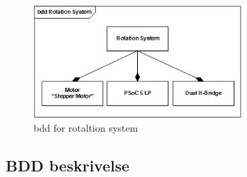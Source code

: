 \begin{figure}[H]
	\centering
	\includegraphics[width=0.7\textwidth, angle = 0]{Images/Hardwarearkitektur/BDD_Rotation_System_JPEG.jpg}
	\caption{bdd for rotaltion system}
	\label{fig:bdd_rotaltion}
\end{figure}
\FloatBarrier

\subsection{BDD beskrivelse}

